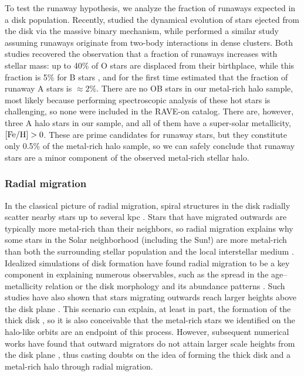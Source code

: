 \documentclass[apj, twocolappendix, numberedappendix, appendixfloats]{emulateapj}
\begin{document}
To test the runaway hypothesis, we analyze the fraction of runaways expected in a disk population.
Recently, \citet{bromley2009} studied the dynamical evolution of stars ejected from the disk via the massive binary mechanism, while \citet{perets2012} performed a similar study assuming runaways originate from two-body interactions in dense clusters.
Both studies recovered the observation that a fraction of runaways increases with stellar mass: up to 40\% of O stars are displaced from their birthplace, while this fraction is 5\% for B stars \citep{blaauw1961, gies1986}, and for the first time estimated that the fraction of runaway A stars is $\approx2\%$.
There are no OB stars in our metal-rich halo sample, most likely because performing spectroscopic analysis of these hot stars is challenging, so none were included in the RAVE-on catalog.
There are, however, three A halo stars in our sample, and all of them have a super-solar metallicity, $\rm[Fe/H]>0$.
These are prime candidates for runaway stars, but they constitute only 0.5\% of the metal-rich halo sample, so we can safely conclude that runaway stars are a minor component of the observed metal-rich stellar halo.

\subsubsection{Radial migration}
\label{sec:migration}
In the classical picture of radial migration, spiral structures in the disk radially scatter nearby stars up to several kpc \citep{sellwood2002}.
Stars that have migrated outwards are typically more metal-rich than their neighbors, so radial migration explains why some stars in the Solar neighborhood (including the Sun!) are more metal-rich than both the surrounding stellar population and the local interstellar medium \citep{wielen1996}.
Idealized simulations of disk formation have found radial migration to be a key component in explaining numerous observables, such as the spread in the age--metallicity relation \citep{roskar2008} or the disk morphology and its abundance patterns \citep{schonrich2009}.
Such studies have also shown that stars migrating outwards reach larger heights above the disk plane \citep[e.g.,][]{schonrich2009, loebman2011}.
This scenario can explain, at least in part, the formation of the thick disk \citep[e.g.,][]{wilson2011}, so it is also conceivable that the metal-rich stars we identified on the halo-like orbits are an endpoint of this process.
However, subsequent numerical works have found that outward migrators do not attain larger scale heights from the disk plane \citep{minchev2012, vera-ciro2014}, thus casting doubts on the idea of forming the thick disk and a metal-rich halo through radial migration.
\end{document}
